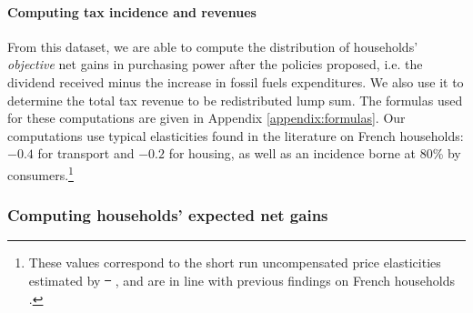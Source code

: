 \documentclass[12pt]{article} %
\providecommand{\DIFaddtex}[1]{{\protect\color{blue}\uwave{#1}}} %
\providecommand{\DIFdeltex}[1]{{\protect\color{red}\sout{#1}}}                      %
\providecommand{\DIFaddbegin}{} %
\providecommand{\DIFaddend}{} %
\providecommand{\DIFdelbegin}{} %
\providecommand{\DIFdelend}{} %
\providecommand{\DIFadd}[1]{\texorpdfstring{\DIFaddtex{#1}}{#1}} %
\providecommand{\DIFdel}[1]{\texorpdfstring{\DIFdeltex{#1}}{}} %
\newcommand{\DIFscaledelfig}{0.5}
\newlength{\DIFdelgraphicswidth} %
\newlength{\DIFdelgraphicsheight} %
\newcommand{\DIFaddincludegraphics}[2][]{{\color{blue}\fbox{\DIFOincludegraphics[#1]{#2}}}} %
\newcommand{\DIFdelincludegraphics}[2][]{%
\sbox{\DIFdelgraphicsbox}{\DIFOincludegraphics[#1]{#2}}%
\settoboxwidth{\DIFdelgraphicswidth}{\DIFdelgraphicsbox} %
\settoboxtotalheight{\DIFdelgraphicsheight}{\DIFdelgraphicsbox} %
\scalebox{\DIFscaledelfig}{%
\parbox[b]{\DIFdelgraphicswidth}{\usebox{\DIFdelgraphicsbox}\\[-\baselineskip] \rule{\DIFdelgraphicswidth}{0em}}\llap{\resizebox{\DIFdelgraphicswidth}{\DIFdelgraphicsheight}{%
\setlength{\unitlength}{\DIFdelgraphicswidth}%
\begin{picture}(1,1)%
\thicklines\linethickness{2pt} %
{\color[rgb]{1,0,0}\put(0,0){\framebox(1,1){}}}%
{\color[rgb]{1,0,0}\put(0,0){\line( 1,1){1}}}%
{\color[rgb]{1,0,0}\put(0,1){\line(1,-1){1}}}%
\end{picture}%
}\hspace*{3pt}}} %
} %
\DeclareRobustCommand{\DIFaddbegin}{\DIFOaddbegin \let\includegraphics\DIFaddincludegraphics} %
\DeclareRobustCommand{\DIFaddend}{\DIFOaddend \let\includegraphics\DIFOincludegraphics} %
\DeclareRobustCommand{\DIFdelbegin}{\DIFOdelbegin \let\includegraphics\DIFdelincludegraphics} %
\DeclareRobustCommand{\DIFdelend}{\DIFOaddend \let\includegraphics\DIFOincludegraphics} %
\begin{document}
 \paragraph{Computing tax incidence and revenues}

From this dataset, we are able to compute the distribution of households' \textit{objective} net gains in purchasing power after the policies proposed, i.e. the dividend received minus the increase in fossil fuels expenditures. We also use it to determine the total tax revenue to be redistributed lump sum. The formulas used for these computations are given in Appendix \ref{appendix:formulas}. Our computations use typical elasticities found in the literature on French households: $-0.4$ for transport and $-0.2$ for housing, as well as an incidence borne at 80\% by consumers.\footnote{These values correspond to the short run uncompensated price elasticities estimated by \DIFdelbegin \DIFdel{\mbox{%
\citet{douenne_vertical_2018}}\hspace{0pt}%
}\DIFdelend \DIFaddbegin \DIFadd{\mbox{%
\citet{douenne_2020}}\hspace{0pt}%
}\DIFaddend , and are in line with previous findings on French households \citep[e.g.][]{clerc_marcus,bureau_distributional_2011}.} 
    \subsubsection{Computing households' expected net gains\label{subsubsec:computation_feedback}}
\end{document}
